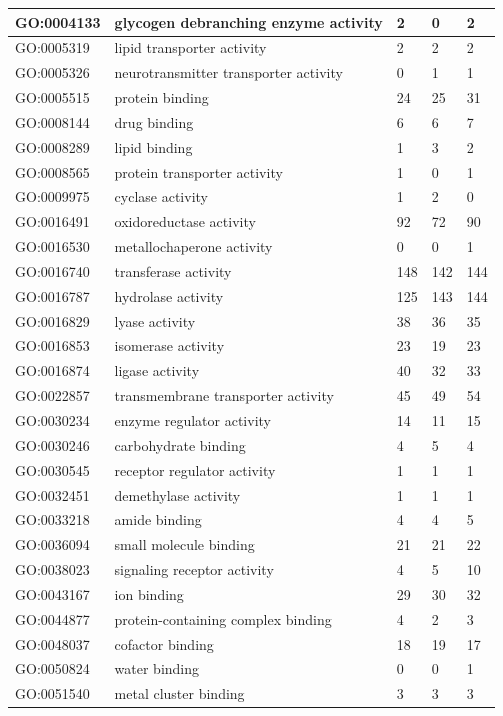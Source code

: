 \documentclass[12pt]{article}
\begin{document}
\begin{longtable}{ | p{2.2cm} | p{4cm} |p{2cm} | p{2cm} | p{2cm} | }
 \hline 
GO:0004133&glycogen debranching enzyme activity&2&0&2\\ 
 \hline 
GO:0005319&lipid transporter activity&2&2&2\\ 
 \hline 
GO:0005326&neurotransmitter transporter activity&0&1&1\\ 
 \hline 
GO:0005515&protein binding&24&25&31\\ 
 \hline 
GO:0008144&drug binding&6&6&7\\ 
 \hline 
GO:0008289&lipid binding&1&3&2\\ 
 \hline 
GO:0008565&protein transporter activity&1&0&1\\ 
 \hline 
GO:0009975&cyclase activity&1&2&0\\ 
 \hline 
GO:0016491&oxidoreductase activity&92&72&90\\ 
 \hline 
GO:0016530&metallochaperone activity&0&0&1\\ 
 \hline 
GO:0016740&transferase activity&148&142&144\\ 
 \hline 
GO:0016787&hydrolase activity&125&143&144\\ 
 \hline 
GO:0016829&lyase activity&38&36&35\\ 
 \hline 
GO:0016853&isomerase activity&23&19&23\\ 
 \hline 
GO:0016874&ligase activity&40&32&33\\ 
 \hline 
GO:0022857&transmembrane transporter activity&45&49&54\\ 
 \hline 
GO:0030234&enzyme regulator activity&14&11&15\\ 
 \hline 
GO:0030246&carbohydrate binding&4&5&4\\ 
 \hline 
GO:0030545&receptor regulator activity&1&1&1\\ 
 \hline 
GO:0032451&demethylase activity&1&1&1\\ 
 \hline 
GO:0033218&amide binding&4&4&5\\ 
 \hline 
GO:0036094&small molecule binding&21&21&22\\ 
 \hline 
GO:0038023&signaling receptor activity&4&5&10\\ 
 \hline 
GO:0043167&ion binding&29&30&32\\ 
 \hline 
GO:0044877&protein-containing complex binding&4&2&3\\ 
 \hline 
GO:0048037&cofactor binding&18&19&17\\ 
 \hline 
GO:0050824&water binding&0&0&1\\ 
 \hline 
GO:0051540&metal cluster binding&3&3&3\\ 

\end{longtable}
\end{document}
